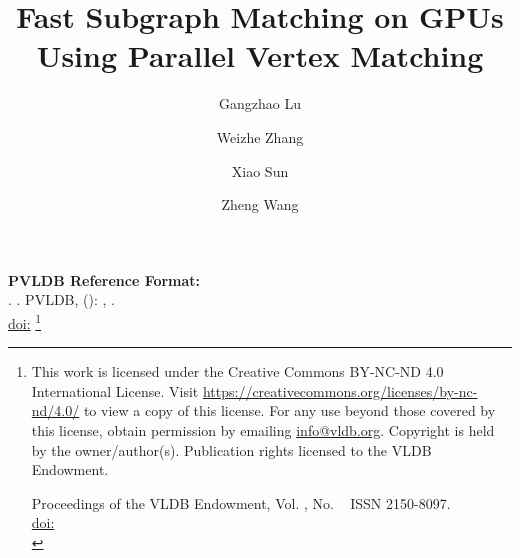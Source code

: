 \documentclass[sigconf, nonacm]{acmart}
\begin{document}
\title{Fast Subgraph Matching on GPUs Using Parallel Vertex Matching}
\author{Gangzhao Lu}

\author{Weizhe Zhang}

\author{Xiao Sun}

\author{Zheng Wang}


\maketitle
\pagestyle{\vldbpagestyle}
\begingroup\small\noindent\raggedright\textbf{PVLDB Reference Format:}\\
\vldbauthors. \vldbtitle. PVLDB, \vldbvolume(\vldbissue): \vldbpages, \vldbyear.\\
\href{https://doi.org/\vldbdoi}{doi:\vldbdoi}
\endgroup
\begingroup
\renewcommand\thefootnote{}\footnote{\noindent
This work is licensed under the Creative Commons BY-NC-ND 4.0 International License. Visit \url{https://creativecommons.org/licenses/by-nc-nd/4.0/} to view a copy of this license. For any use beyond those covered by this license, obtain permission by emailing \href{mailto:info@vldb.org}{info@vldb.org}. Copyright is held by the owner/author(s). Publication rights licensed to the VLDB Endowment. \\
\raggedright Proceedings of the VLDB Endowment, Vol. \vldbvolume, No. \vldbissue\ %
ISSN 2150-8097. \\
\href{https://doi.org/\vldbdoi}{doi:\vldbdoi} \\
}\addtocounter{footnote}{-1}\endgroup












\end{document}
